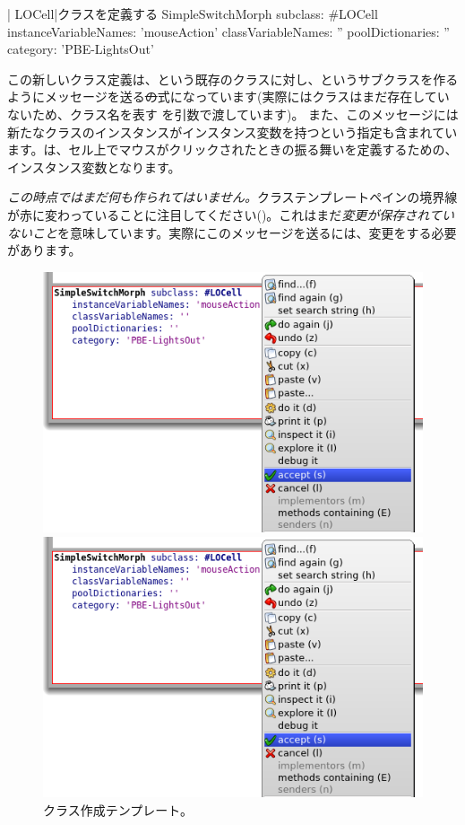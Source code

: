 \documentclass[a4paper,10pt,twoside]{book}
\begin{document}
\begin{classdef}[firstClassDef]{\ct| LOCell|クラスを定義する}
SimpleSwitchMorph subclass: #LOCell
   instanceVariableNames: 'mouseAction'
   classVariableNames: ''
   poolDictionaries: ''
   category: 'PBE-LightsOut'
\end{classdef}

この新しいクラス定義は、という既存のクラスに対し、というサブクラスを作るようにメッセージを送る\st の式になっています(実際にはクラスはまだ存在していないため、クラス名を表す を引数で渡しています)。
また、このメッセージには新たなクラスのインスタンスがインスタンス変数を持つという指定も含まれています。は、セル上でマウスがクリックされたときの振る舞いを定義するための、インスタンス変数となります。

\emph{この時点ではまだ何も作られてはいません。}クラステンプレートペインの境界線が赤に変わっていることに注目してください()。これはまだ\emph{変更が保存されていないこと}を意味しています。実際にこのメッセージを送るには、変更をする必要があります。

\begin{figure}[h!t]
\ifluluelse
	{\centerline {\includegraphics[width=\textwidth]{AcceptClassDef}}}
	{\centerline {\includegraphics[scale=0.7]{AcceptClassDef}}}
\caption{クラス作成テンプレート。
}
\end{figure}
\end{document}
